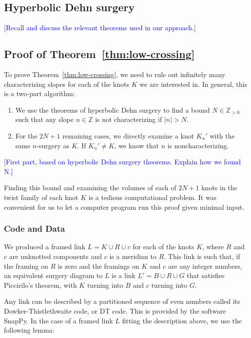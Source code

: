 \documentclass[11pt,usenames,dvipsnames,reqno]{amsart}
\newcommand{\zz}{\mathbb{Z}}
\numberwithin{theorem}{section}
\theoremstyle{ex}
\theoremstyle{rem}
\def\kh#1{\textcolor{Blue}{#1}}
\begin{document}
\subsection{Hyperbolic Dehn surgery} \kh{[Recall and discuss the relevant theorems used in our approach.]}

\subsection{Proof of Theorem~\ref{thm:low-crossing}}

To prove Theorem~\ref{thm:low-crossing}, we need to rule out infinitely many characterizing slopes for each of the knots $K$ we are interested in. In general, this is a two-part algorithm:

\begin{enumerate}
	\item We use the theorems of hyperbolic Dehn surgery to find a bound $N \in \zz_{>0}$ such that any slope $n \in \zz$ is not characterizing if $|n|>N$.
	\item For the $2 N + 1$ remaining cases, we directly examine a knot $K_{n}'$ with the same $n$-surgery as $K$. If $K_{n}' \neq K$, we know that $n$ is noncharacterizing.
\end{enumerate}

\kh{[First part, based on hyperbolic Dehn surgery theorems. Explain how we found N.]}

Finding this bound and examining the volumes of each of $2 N + 1$ knots in the twist family of each knot $K$ is a tedious computational problem. It was convenient for us to let a computer program run this proof given minimal input.

\subsubsection{Code and Data}\label{sec:code}
We produced a framed link $L = K \cup R \cup c$ for each of the knots $K$, where $R$ and $c$ are unknotted components and $c$ is a meridian to $R$. This link is such that, if the framing on $R$ is zero and the framings on $K$ and $c$ are any integer numbers, an equivalent surgery diagram to $L$ is a link $L' = B \cup R \cup G$ that satisfies Piccirilo's theorem, with $K$ turning into $B$ and $c$ turning into $G$.

Any link can be described by a partitioned sequence of even numbers called its Dowker-Thistlethwaite  code, or DT code. This is provided by the software SnapPy. In the case of a framed link $L$ fitting the description above, we use the following lemma:
\end{document}
